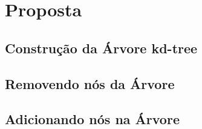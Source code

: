 \chapter{Proposta}

\section{Construção da Árvore kd-tree}

\section{Removendo nós da Árvore}

\section{Adicionando nós na Árvore}

